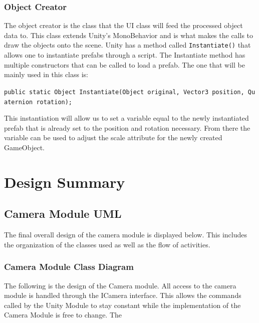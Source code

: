 \documentclass[12pt]{article}
\begin{document}
\subsubsection{Object Creator}\label{object-creator}

The object creator is the class that the UI class will feed the
processed object data to. This class extends Unity's MonoBehavior and is
what makes the calls to draw the objects onto the scene. Unity has a
method called \texttt{Instantiate()} that allows one to instantiate
prefabs through a script. The Instantiate method has multiple
constructors that can be called to load a prefab. The one that will be
mainly used in this class is:

\texttt{public\ static\ Object\ Instantiate(Object\ original,\ Vector3\ position,\ Quaternion\ rotation);}

This instantiation will allow us to set a variable equal to the newly
instantiated prefab that is already set to the position and rotation
necessary. From there the variable can be used to adjust the scale
attribute for the newly created GameObject.

\section{Design Summary}\label{design-summary}

\subsection{Camera Module UML}\label{camera-module-uml}

The final overall design of the camera module is displayed below. This
includes the organization of the classes used as well as the flow of
activities.

\subsubsection{Camera Module Class
Diagram}\label{camera-module-class-diagram}

The following is the design of the Camera module. All access to the
camera module is handled through the ICamera interface. This allows the
commands called by the Unity Module to stay constant while the
implementation of the Camera Module is free to change. The
\end{document}
